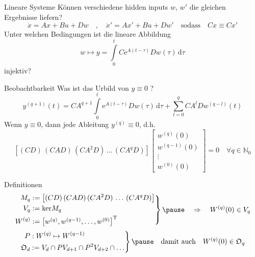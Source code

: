 \begin{frame}{Lineare Systeme}
	\pause
	Können verschiedene hidden inputs $w$, $w'$ die gleichen Ergebnisse liefern?
	\begin{equation}
	\dot{x} = Ax + Bu + Dw \quad ,\quad \dot{x}' = Ax' + Bu + Dw' \quad \text{sodass} \quad Cx \equiv Cx'
	\end{equation} \pause
	Unter welchen Bedingungen ist die lineare Abbildung
	\begin{equation}
	w \mapsto y = \int\limits_0^{t} C\text{e}^{A(t-\tau)} D w(\tau) \, \text{d}\tau
	\end{equation}
	injektiv?
\end{frame}

\begin{frame}{Beobachtbarkeit}
	Was ist das Urbild von $y\equiv 0$ ? \pause
	\begin{equation}
	y^{(q+1)}(t) = CA^{q+1} \int\limits_0^t \text{e}^{A(t-\tau)}Dw(\tau)\,\text{d}\tau + \sum\limits_{l=0}^q
	CA^lD w^{(q-l)}(t)
	\end{equation} \pause
	Wenn $y\equiv 0$, dann jede Ableitung $y^{(q)}\equiv 0$, d.h. \pause
	\begin{equation}
	\left[ (CD) \, (CAD) \, (CA^2D)\,\ldots \, (CA^qD) \right] \begin{bmatrix}
	w^{(q)}(0) \\ w^{(q-1)}(0) \\ \vdots \\ w^{(0)}(0)
	\end{bmatrix} = 0 \quad \forall q\in\mathbb{N}_0
	\end{equation}
\end{frame}

\begin{frame}{Definitionen} 
	\pause
	\begin{equation}
		\left.
		\begin{aligned}
		M_q &:=\left[ (CD) \, (CAD) \, (CA^2D)\,\ldots \, (CA^qD) \right]\\ 
		V_q &:= \text{ker} M_q 	\\
		W^{(q)} &:= \begin{bmatrix} w^{(q)} , w^{(q-1)}, \hdots , w^{(0)}\end{bmatrix}^\text{T} 
		\end{aligned} \right\} \pause
		\quad \Rightarrow \quad  W^{(q)}(0)\in V_q 
	\end{equation}
	\pause
	\begin{equation} 
		\left.
		\begin{aligned}
		P&: W^{(q)}\mapsto W^{(q-1)} \\ 
		\mathfrak{O}_d &:= V_d \cap P V_{d+1} \cap P^2 V_{d+2} \cap \ldots  	\\
		\end{aligned} \right\} \pause
		\quad \text{damit auch}\quad  W^{(q)}(0)\in \mathfrak{O}_q 
	\end{equation}
\end{frame}

